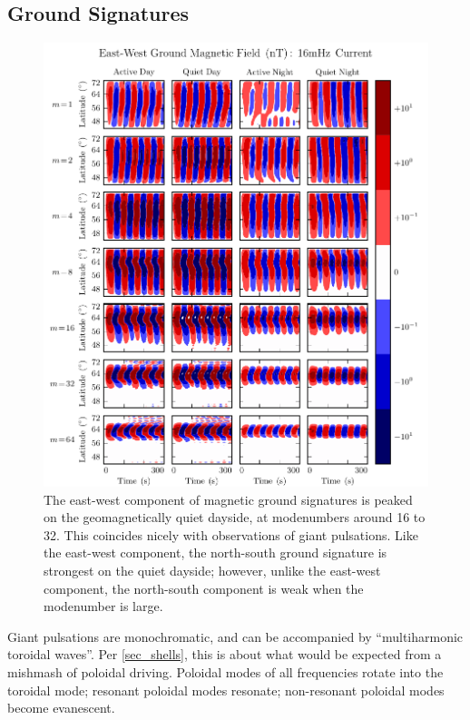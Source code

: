 \subsection{Ground Signatures}


\begin{figure}[H]
    \centering
    \includegraphics[width=\textwidth]{figures/BfE_016mHz.pdf}
    \caption[Dayside Ground Magnetic Fields]{
      The east-west component of magnetic ground signatures is peaked on the geomagnetically quiet dayside, at modenumbers around 16 to 32. This coincides nicely with observations of giant pulsations. Like the east-west component, the north-south ground signature is strongest on the quiet dayside; however, unlike the east-west component, the north-south component is weak when the modenumber is large. 
    }
    \label{fig_ground_signatures}
\end{figure}

Giant pulsations are monochromatic, and can be accompanied by ``multiharmonic toroidal waves''\cite{takahashi_2011}. Per \cref{sec_shells}, this is about what would be expected from a mishmash of poloidal driving. Poloidal modes of all frequencies rotate into the toroidal mode; resonant poloidal modes resonate; non-resonant poloidal modes become evanescent. 

